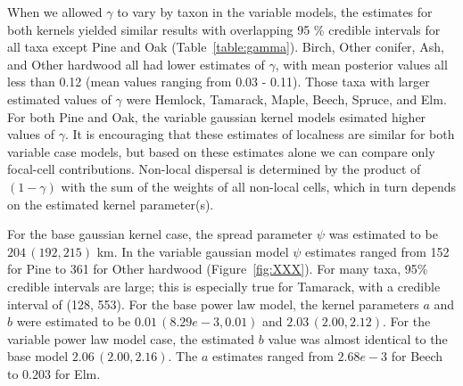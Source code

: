 \documentclass[12pt]{article}
\begin{document}
When we allowed $\gamma$ to vary by taxon in the variable models, the
estimates for both kernels yielded similar results with overlapping 95
\% credible intervals for all taxa except Pine and Oak
(Table~\ref{table:gamma}). Birch, Other conifer, Ash, and Other
hardwood all had lower estimates of $\gamma$, with mean posterior
values all less than 0.12 (mean values ranging from 0.03 -
0.11). Those taxa with larger estimated values of $\gamma$ were
Hemlock, Tamarack, Maple, Beech, Spruce, and Elm. For both Pine and
Oak, the variable gaussian kernel models esimated higher values of
$\gamma$. It is encouraging that these estimates of localness are
similar for both variable case models, but based on these estimates
alone we can compare only focal-cell contributions. Non-local
dispersal is determined by the product of $(1-\gamma)$ with the sum of
the weights of all non-local cells, which in turn depends on the
estimated kernel parameter(s).

For the base gaussian kernel case, the spread parameter $\psi$ was
estimated to be $204\,(192, 215)$ km. In the variable gaussian model
$\psi$ estimates ranged from 152 for Pine to 361 for Other hardwood
(Figure~\ref{fig:XXX}). For many taxa, 95\% credible intervals are large;
this is especially true for Tamarack, with a credible interval of
(128, 553). For the base power law model, the kernel parameters $a$
and $b$ were estimated to be $0.01\,(8.29e-3, 0.01)$ and $2.03\,(2.00,
2.12)$. For the variable power law model case, the estimated $b$ value
was almost identical to the base model $2.06\,(2.00, 2.16)$. The $a$
estimates ranged from $2.68e-3$ for Beech to $0.203$ for Elm.
\end{document}
